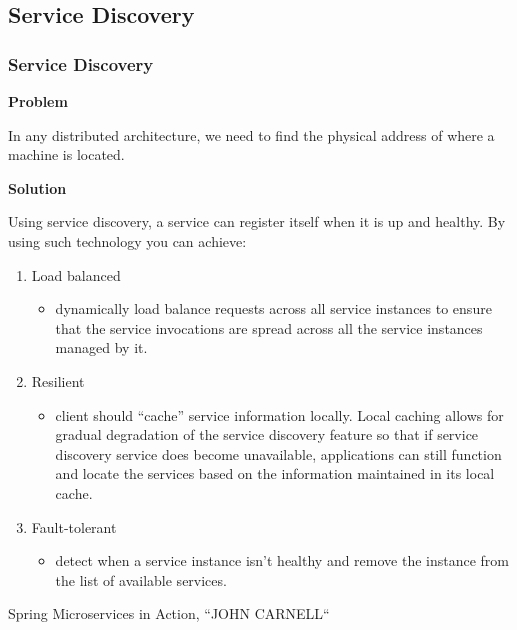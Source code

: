 \documentclass{beamer}
\begin{document}
	\subsection {Service Discovery}
		\begin{frame}
			\frametitle{Service Discovery}
			\scriptsize
				\textbf {Problem} \par
				In any distributed architecture, we need to find the physical address of where a machine is located.
				
				\vspace{2mm}
				\textbf {Solution} \par	
					Using service discovery, a service can register itself when it is up and healthy. By using such technology you can achieve: 
						\begin{enumerate}
							\item<1->	Load balanced
								\begin{itemize}
									\item \scriptsize {dynamically load balance requests across all service instances to ensure that the service invocations are spread across all the service instances managed by it.}
								\end{itemize}
							\item<2-> 	Resilient
								\begin{itemize}
									\item \scriptsize {client should “cache” service information locally. Local caching allows for gradual 		degradation of the service discovery feature so that if service discovery service does become unavailable, applications can still function and locate the services based on the information maintained in its local cache.}
								\end{itemize}
							\item<3->	Fault-tolerant
								\begin{itemize}
									\item \scriptsize {detect when a service instance isn’t healthy and remove the instance from the list of available services.}
								\end{itemize}
							
						\end{enumerate}
			\vspace{10mm}
			\tiny{Spring Microservices in Action, ``JOHN CARNELL``}	
		\end{frame}
		
\end{document}
